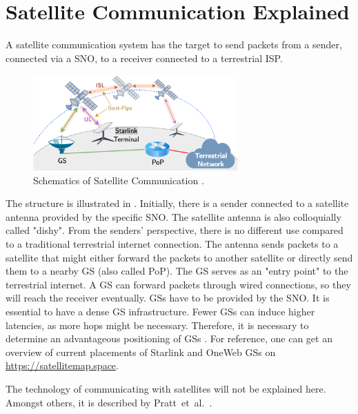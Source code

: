 \section{Satellite Communication Explained} \label{sec:satellite-communication-explained}

A satellite communication system has the target to send packets from a sender,
connected via a \ac{SNO}, to a receiver connected to a terrestrial ISP.

\begin{figure}[!ht]
	\centering
	\includegraphics[width=0.7\textwidth]{./chapters/2-background/img/satcom-structure-mohan.png}
	\caption{Schematics of Satellite Communication \cite{DBLP:conf/www/MohanFCBRMO24}.}
	\label{fig:sat-com-explained}
\end{figure}

The structure is illustrated in . Initially, there
is a sender connected to a satellite antenna provided by the specific \ac{SNO}.
The satellite antenna is also colloquially called "dishy". From the senders'
perspective, there is no different use compared to a traditional terrestrial
internet connection. The antenna sends packets to a satellite that might either
forward the packets to another satellite or directly send them to a nearby
\ac{GS} (also called \ac{PoP}). The \ac{GS} serves as an "entry point" to the
terrestrial internet. A \ac{GS} can forward packets through wired connections,
so they will reach the receiver eventually. \ac{GS}s have to be provided by the
\ac{SNO}. It is essential to have a dense \ac{GS} infrastructure. Fewer
\ac{GS}s can induce higher latencies, as more hops might be necessary.
Therefore, it is necessary to determine an advantageous positioning of \ac{GS}s
\cite{DBLP:conf/sigcomm/VasishtSC21}. For reference, one can get an overview of
current placements of Starlink and OneWeb \ac{GS}s on
\url{https://satellitemap.space}.

The technology of communicating with satellites will not be explained here.
Amongst others, it is described by Pratt~et~al.~\cite{pratt2019satellite}.

